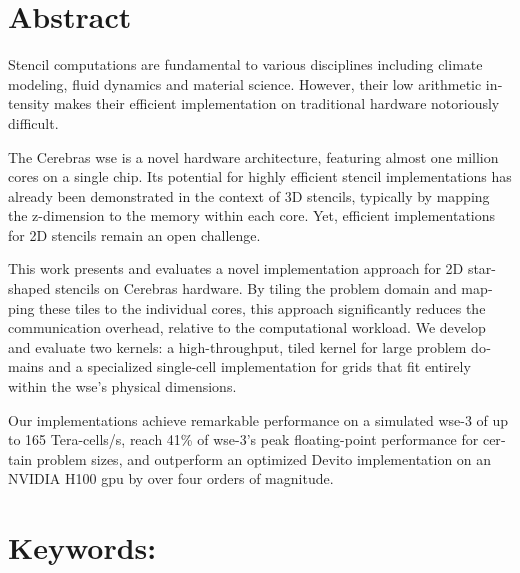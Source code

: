 \begin{otherlanguage}{english}
\section*{Abstract}
Stencil computations are fundamental to various disciplines including climate modeling, fluid dynamics and material science.
However, their low arithmetic intensity makes their efficient implementation on traditional hardware notoriously difficult.

The Cerebras \acf{wse} is a novel hardware architecture, featuring almost one million cores on a single chip. Its potential for highly efficient stencil implementations has already been demonstrated in the context of 3D stencils, typically by mapping the z-dimension to the memory within each core. Yet, efficient implementations for 2D stencils remain an open challenge.

This work presents and evaluates a novel implementation approach for 2D star-shaped stencils on Cerebras hardware. By tiling the problem domain and mapping these tiles to the individual cores, this approach significantly reduces the communication overhead, relative to the computational workload. We develop and evaluate two kernels: a high-throughput, tiled kernel for large problem domains and a specialized single-cell implementation for grids that fit entirely within the \ac{wse}'s physical dimensions.

Our implementations achieve remarkable performance on a simulated \ac{wse}-3 of up to 165 Tera-cells/s, reach 41\% of \ac{wse}-3's peak floating-point performance for certain problem sizes, and outperform an optimized Devito implementation on an NVIDIA H100 \ac{gpu} by over four orders of magnitude. 
\section*{Keywords:} \itshape \englishkeywords
\end{otherlanguage}